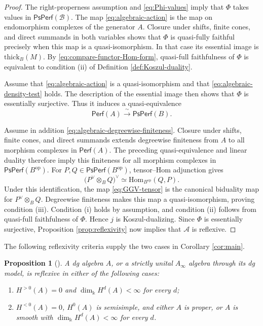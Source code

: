 \documentclass[11pt,letterpaper,reqno]{amsart}
\theoremstyle{plain}
\newtheorem{proposition}[proposition]{Proposition}
\theoremstyle{definition}
\theoremstyle{plain}
\theoremstyle{definition}
\numberwithin{equation}{section}
\begin{document}
\begin{proof}
The right-properness assumption and \eqref{eq:Phi-values} imply that $\Phi$ takes values in $\mathsf{PsPerf}(\mathscr B)$.
The map \eqref{eq:algebraic-action} is the map on endomorphism complexes of the generator $A$.
Closure under shifts, finite cones, and direct summands in both variables shows that $\Phi$ is quasi-fully faithful precisely when this map is a quasi-isomorphism.
In that case its essential image is $\mathrm{thick}_B(M)$.
By \eqref{eq:compare-functor-Hom-form}, quasi-full faithfulness of $\Phi$ is equivalent to condition (ii) of Definition \ref{def:Koszul-duality}.

Assume that \eqref{eq:algebraic-action} is a quasi-isomorphism and that \eqref{eq:algebraic-density-test} holds.
The description of the essential image then shows that $\Phi$ is essentially surjective.
Thus it induces a quasi-equivalence
\[
\mathsf{Perf}(A)\xrightarrow{\;\sim\;}\mathsf{PsPerf}(B).
\]

Assume in addition \eqref{eq:algebraic-degreewise-finiteness}.
Closure under shifts, finite cones, and direct summands extends degreewise finiteness from $A$ to all morphism complexes in $\mathsf{Perf}(A)$.
The preceding quasi-equivalence and linear duality therefore imply this finiteness for all morphism complexes in $\mathsf{PsPerf}(B^{\mathrm{op}})$.
For $P,Q\in\mathsf{PsPerf}(B^{\mathrm{op}})$, tensor--Hom adjunction gives
\begin{equation}\label{eq:algebraic-biduality}
\bigl(P^\vee\otimes_B Q\bigr)^\vee
\simeq\mathrm{Hom}_{B^{\mathrm{op}}}(Q,P).
\end{equation}
Under this identification, the map \eqref{eq:GGV-tensor} is the canonical biduality map for $P^\vee\otimes_B Q$.
Degreewise finiteness makes this map a quasi-isomorphism, proving condition (iii).
Condition (i) holds by assumption, and condition (ii) follows from quasi-full faithfulness of $\Phi$.
Hence $j$ is Koszul-dualizing.
Since $\Phi$ is essentially surjective, Proposition \ref{prop:reflexivity} now implies that $\mathscr A$ is reflexive.
\end{proof}

The following reflexivity criteria supply the two cases in Corollary \ref{cor:main}.

\begin{proposition}[{\cite[Corollaries 3.4.3, 3.3.2, 3.3.6]{Booth-Goodbody-Opper2025}}]\label{prop:algebraic-reflexivity}
A dg algebra $A$, or a strictly unital $A_\infty$ algebra through its dg model, is reflexive in either of the following cases:
\begin{enumerate}
    \item[(i)] $H^{>0}(A)=0$ and $\dim_{\Bbbk}H^d(A)<\infty$ for every $d$;
    \item[(ii)] $H^{<0}(A)=0$, $H^0(A)$ is semisimple, and either $A$ is proper, or $A$ is smooth with $\dim_{\Bbbk}H^d(A)<\infty$ for every $d$.
\end{enumerate}
\end{proposition}
\end{document}
